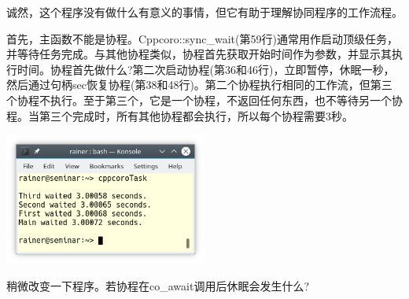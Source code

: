 诚然，这个程序没有做什么有意义的事情，但它有助于理解协同程序的工作流程。

首先，主函数不能是协程。Cppcoro::sync\_wait(第59行)通常用作启动顶级任务，并等待任务完成。与其他协程类似，协程首先获取开始时间作为参数，并显示其执行时间。协程首先做什么?第二次启动协程(第36和46行)，立即暂停，休眠一秒，然后通过句柄sec恢复协程(第38和48行)。第二个协程执行相同的工作流，但第三个协程不执行。至于第三个，它是一个协程，不返回任何东西，也不等待另一个协程。当第三个完成时，所有其他协程都会执行，所以每个协程需要3秒。

\begin{center}
\includegraphics[width=0.5\textwidth]{content/5/chapter8/images/1.png}\\
\end{center}

稍微改变一下程序。若协程在co\_await调用后休眠会发生什么?

